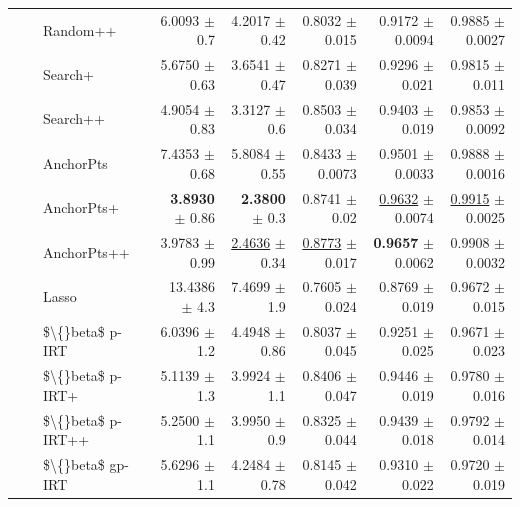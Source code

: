 \begin{longtable}{llp{}rrrrr}
 &  & Random++ & 6.0093 {\scriptsize $\pm$ 0.7} & 4.2017 {\scriptsize $\pm$ 0.42} & 0.8032 {\scriptsize $\pm$ 0.015} & 0.9172 {\scriptsize $\pm$ 0.0094} & 0.9885 {\scriptsize $\pm$ 0.0027} \\
 &  & Search+ & 5.6750 {\scriptsize $\pm$ 0.63} & 3.6541 {\scriptsize $\pm$ 0.47} & 0.8271 {\scriptsize $\pm$ 0.039} & 0.9296 {\scriptsize $\pm$ 0.021} & 0.9815 {\scriptsize $\pm$ 0.011} \\
 &  & Search++ & 4.9054 {\scriptsize $\pm$ 0.83} & 3.3127 {\scriptsize $\pm$ 0.6} & 0.8503 {\scriptsize $\pm$ 0.034} & 0.9403 {\scriptsize $\pm$ 0.019} & 0.9853 {\scriptsize $\pm$ 0.0092} \\
 &  & AnchorPts & 7.4353 {\scriptsize $\pm$ 0.68} & 5.8084 {\scriptsize $\pm$ 0.55} & 0.8433 {\scriptsize $\pm$ 0.0073} & 0.9501 {\scriptsize $\pm$ 0.0033} & 0.9888 {\scriptsize $\pm$ 0.0016} \\
 &  & AnchorPts+ & \textbf{3.8930} {\scriptsize $\pm$ 0.86} & \textbf{2.3800} {\scriptsize $\pm$ 0.3} & 0.8741 {\scriptsize $\pm$ 0.02} & \underline{0.9632} {\scriptsize $\pm$ 0.0074} & \underline{0.9915} {\scriptsize $\pm$ 0.0025} \\
 &  & AnchorPts++ & 3.9783 {\scriptsize $\pm$ 0.99} & \underline{2.4636} {\scriptsize $\pm$ 0.34} & \underline{0.8773} {\scriptsize $\pm$ 0.017} & \textbf{0.9657} {\scriptsize $\pm$ 0.0062} & 0.9908 {\scriptsize $\pm$ 0.0032} \\
 &  & Lasso & 13.4386 {\scriptsize $\pm$ 4.3} & 7.4699 {\scriptsize $\pm$ 1.9} & 0.7605 {\scriptsize $\pm$ 0.024} & 0.8769 {\scriptsize $\pm$ 0.019} & 0.9672 {\scriptsize $\pm$ 0.015} \\
 &  & \$\textbackslash\{\}beta\$ p-IRT & 6.0396 {\scriptsize $\pm$ 1.2} & 4.4948 {\scriptsize $\pm$ 0.86} & 0.8037 {\scriptsize $\pm$ 0.045} & 0.9251 {\scriptsize $\pm$ 0.025} & 0.9671 {\scriptsize $\pm$ 0.023} \\
 &  & \$\textbackslash\{\}beta\$ p-IRT+ & 5.1139 {\scriptsize $\pm$ 1.3} & 3.9924 {\scriptsize $\pm$ 1.1} & 0.8406 {\scriptsize $\pm$ 0.047} & 0.9446 {\scriptsize $\pm$ 0.019} & 0.9780 {\scriptsize $\pm$ 0.016} \\
 &  & \$\textbackslash\{\}beta\$ p-IRT++ & 5.2500 {\scriptsize $\pm$ 1.1} & 3.9950 {\scriptsize $\pm$ 0.9} & 0.8325 {\scriptsize $\pm$ 0.044} & 0.9439 {\scriptsize $\pm$ 0.018} & 0.9792 {\scriptsize $\pm$ 0.014} \\
 &  & \$\textbackslash\{\}beta\$ gp-IRT & 5.6296 {\scriptsize $\pm$ 1.1} & 4.2484 {\scriptsize $\pm$ 0.78} & 0.8145 {\scriptsize $\pm$ 0.042} & 0.9310 {\scriptsize $\pm$ 0.022} & 0.9720 {\scriptsize $\pm$ 0.019} \\

\end{longtable}
